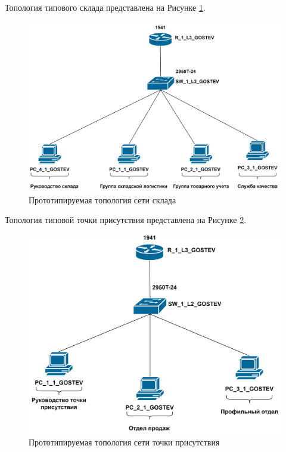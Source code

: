 \documentclass[14pt, a4paper]{extarticle}
\numberwithin{equation}{section}
\begin{document}
Топология типового склада представлена на Рисунке \ref{fig:warehouseTopo}.
\begin{figure}[H]
        \centering
        \includegraphics[scale=0.2]{topo_warehouse.png}
        \caption{Прототипируемая топология сети склада}
        \label{fig:warehouseTopo}
\end{figure}

Топология типовой точки присутствия представлена на Рисунке \ref{fig:tpTopo}.
\begin{figure}[H]
        \centering
        \includegraphics[scale=0.2]{topo_tp.png}
        \caption{Прототипируемая топология сети точки присутствия}
        \label{fig:tpTopo}
\end{figure}



\begingroup
\let\itshape\upshape
\sloppy
\printbibliography[title=СПИСОК ИСПОЛЬЗУЕМЫХ ИСТОЧНИКОВ]
\endgroup
\end{document}
